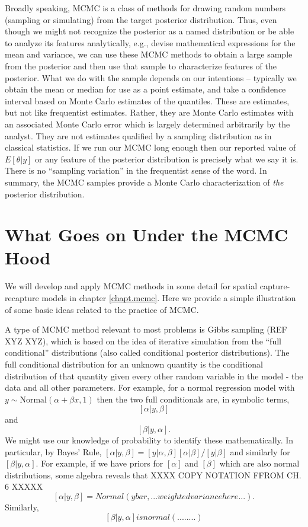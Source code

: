 Broadly speaking, MCMC is a class of methods for drawing random
numbers (sampling or simulating) from the target posterior
distribution.  Thus, even though we might not recognize the posterior
as a named distribution or be able to analyze its features
analytically, e.g., devise mathematical expressions for the mean and
variance, we can use these MCMC methods to obtain a large sample from
the posterior and then use that sample to characterize features of the
posterior. What we do with the sample depends on our intentions --
typically we obtain the mean or median for use as a point estimate,
and take a confidence interval based on Monte Carlo estimates of the
quantiles.  These are estimates, but not like frequentist
estimates. Rather, they are Monte Carlo estimates with an associated
Monte Carlo error which is largely determined arbitrarily by the
analyst. They are not estimates qualified by a sampling distribution
as in classical statistics. If we run our MCMC long enough then our
reported value of $E[\theta|y]$ or any feature of the posterior
distribution is precisely what we say it is. There is no ``sampling
variation'' in the frequentist sense of the word.  In summary, the
MCMC samples provide a Monte Carlo characterization of {\it the}
posterior distribution.


\section{What Goes on Under the MCMC Hood}

We will develop and apply MCMC methods in some detail for spatial
capture-recapture models in chapter \ref{chapt.mcmc}. Here we provide
a simple illustration of some basic ideas related to the practice of MCMC.

A type of MCMC method relevant to most problems is Gibbs sampling (REF
XYZ XYZ),
which is based on the idea of iterative simulation from the ``full
conditional'' distributions (also called conditional posterior
distributions). The full conditional distribution for an unknown
quantity is the conditional distribution of that quantity given every
other random variable in the model - the data and all other
parameters. For example, for a normal regression model with $y \sim
\mbox{Normal}(\alpha + \beta x , 1)$ then the two full conditionals are, in
symbolic terms,
\[ 
[\alpha|y,\beta]
\]
 and 
\[
[\beta|y,\alpha].
\]
We might use our knowledge of probability to identify these
mathematically. In particular, by Bayes' Rule, $[\alpha|y,\beta] =
[y|\alpha,\beta][\alpha|\beta]/[y|\beta]$ and similarly for
$[\beta|y,\alpha]$. For example, if we have priors for $[\alpha]$ and $[\beta]$
which are also normal distributions, some algebra reveals that
XXXX COPY NOTATION FFROM CH. 6 XXXXX
\[
[\alpha|y,\beta] = Normal(ybar,...weighted variance here...). 
\]
Similarly,
\[
 [\beta|y,\alpha] is normal(........) 
\]

